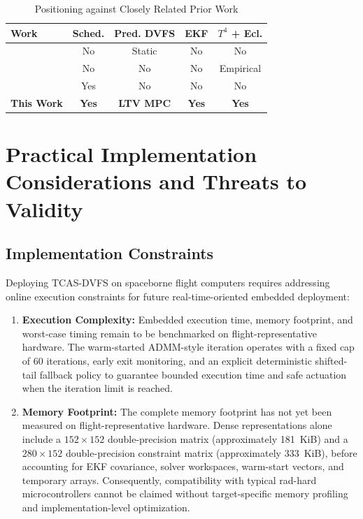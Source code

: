 \documentclass[a4paper,fleqn]{cas-dc}
\begin{document}
\begin{table}[t]
\caption{Positioning against Closely Related Prior Work}
\label{tab:relacionados}
\centering
\footnotesize
\setlength{\tabcolsep}{1.5pt}
\begin{tabular*}{\columnwidth}{@{\extracolsep{\fill}}lcccc@{}}
\toprule
\textbf{Work} & \textbf{Sched.} & \textbf{Pred. DVFS} & \textbf{EKF} & \textbf{$T^4$ + Ecl.} \\
\midrule
\citet{murali2007convex} & No & Static & No & No \\
\citet{yuan2025heat} & No & No & No & Empirical \\
\citet{chen2026hotai} & Yes & No & No & No \\
\textbf{This Work} & \textbf{Yes} & \textbf{LTV MPC} & \textbf{Yes} & \textbf{Yes} \\
\bottomrule
\end{tabular*}
\end{table}

\section{Practical Implementation Considerations and Threats to Validity}
\label{sec:practice}

\subsection{Implementation Constraints}
Deploying TCAS-DVFS on spaceborne flight computers requires addressing online execution constraints for future real-time-oriented embedded deployment:
\begin{enumerate}
\item \textbf{Execution Complexity:} Embedded execution time, memory footprint, and worst-case timing remain to be benchmarked on flight-representative hardware. The warm-started ADMM-style iteration operates with a fixed cap of 60 iterations, early exit monitoring, and an explicit deterministic shifted-tail fallback policy to guarantee bounded execution time and safe actuation when the iteration limit is reached.
\item \textbf{Memory Footprint:} The complete memory footprint has not yet been measured on flight-representative hardware. Dense representations alone include a $152\times152$ double-precision matrix (approximately 181~KiB) and a $280\times152$ double-precision constraint matrix (approximately 333~KiB), before accounting for EKF covariance, solver workspaces, warm-start vectors, and temporary arrays. Consequently, compatibility with typical rad-hard microcontrollers cannot be claimed without target-specific memory profiling and implementation-level optimization.
\end{enumerate}
\end{document}
